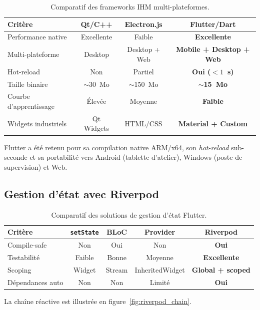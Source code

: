 \documentclass[12pt,a4paper]{report}
\newcommand{\code}[1]{\texttt{\small #1}}
\begin{document}
\begin{table}[H]
\centering
\caption{Comparatif des frameworks IHM multi-plateformes.}
\label{tab:framework}
\begin{tabularx}{\textwidth}{l c c c}
\toprule
Critère & Qt/C++ & Electron.js & \textbf{Flutter/Dart} \\
\midrule
Performance native & Excellente & Faible & \textbf{Excellente} \\
Multi-plateforme & Desktop & Desktop + Web & \textbf{Mobile + Desktop + Web} \\
Hot-reload & Non & Partiel & \textbf{Oui ($< 1$~s)} \\
Taille binaire & $\sim$30~Mo & $\sim$150~Mo & \textbf{$\sim$15~Mo} \\
Courbe d'apprentissage & Élevée & Moyenne & \textbf{Faible} \\
Widgets industriels & Qt Widgets & HTML/CSS & \textbf{Material + Custom} \\
\bottomrule
\end{tabularx}
\end{table}

Flutter a été retenu pour sa compilation native ARM/x64, son \textit{hot-reload} sub-seconde et sa portabilité vers Android (tablette d'atelier), Windows (poste de supervision) et Web.

\subsection{Gestion d'état avec Riverpod}

\begin{table}[H]
\centering
\caption{Comparatif des solutions de gestion d'état Flutter.}
\label{tab:state_mgmt}
\begin{tabularx}{\textwidth}{l c c c >{\bfseries}c}
\toprule
Critère & \code{setState} & BLoC & Provider & Riverpod \\
\midrule
Compile-safe & Non & Oui & Non & Oui \\
Testabilité & Faible & Bonne & Moyenne & Excellente \\
Scoping & Widget & Stream & InheritedWidget & Global + scoped \\
Dépendances auto & Non & Non & Limité & Oui \\
\bottomrule
\end{tabularx}
\end{table}

La chaîne réactive est illustrée en figure~\ref{fig:riverpod_chain}.
\end{document}
